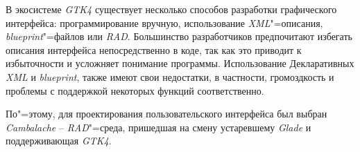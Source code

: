 \documentclass[variant=courcework]{bsuir}
\begin{document}
В экосистеме \textit{GTK4} существует несколько способов разработки графического
интерфейса: программирование вручную, использование \textit{XML}"=описания,
\textit{blueprint}"=файлов или \textit{RAD}. Большинство разработчиков
предпочитают избегать описания интерфейса непосредственно в коде, так как это
приводит к избыточности и усложняет понимание программы. Использование
Декларативных \textit{XML} и \textit{blueprint}, также имеют свои недостатки, в
частности, громоздкость и проблемы с поддержкой некоторых функций
соответственно.

По"=этому, для проектирования пользовательского интерфейса был выбран
\textit{Cambalache} -- \textit{RAD}"=среда, пришедшая на смену устаревшему
\textit{Glade} и поддерживающая \textit{GTK4}.











\end{document}
